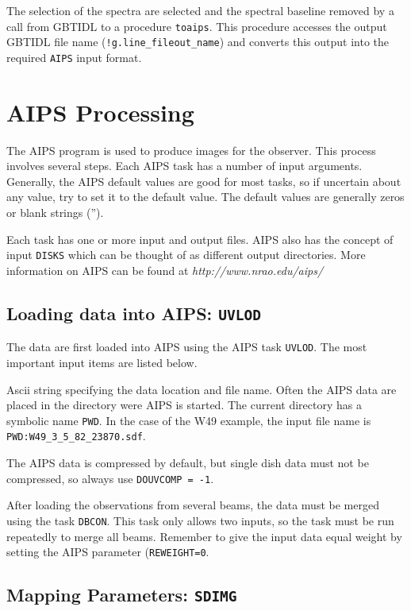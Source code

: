 \documentclass[12pt,twoside]{article}
\newcommand{\myitem}[1]{\item{\makebox[1.25in][l]{{\tt #1}}}}
\begin{document}
The selection of the spectra are selected and the spectral baseline removed by a
call from GBTIDL to a procedure {\tt toaips}.  This procedure accesses the 
output GBTIDL file name ({\tt !g.line\_fileout\_name}) and converts this
output into the required {\tt AIPS} input format.

\section{AIPS Processing}

The AIPS program is used to produce images for the observer.   This process
involves several steps.
Each AIPS task has a number of input arguments.   
Generally, the AIPS default values are good for most tasks, so if uncertain
about any value, try to set it to the default value.  The default values are
generally zeros or blank strings ('').

Each task has one or more input and output files.   AIPS also has the
concept of input {\tt DISKS} which can be thought of as different
output directories.   More information on AIPS can be found at
{\it http://www.nrao.edu/aips/}

\subsection{Loading data into AIPS: {\tt UVLOD}}
The data are first loaded into AIPS using the AIPS task {\tt UVLOD}.   
The most important input items are listed below.
\begin{description}
\myitem{ DATAIN}  Ascii string specifying the data location and file name.
Often the AIPS data are placed in the directory were AIPS is started.  
The current directory has a symbolic name {\tt PWD}.   
In the case of the W49 example, the input file name is 
{\tt PWD:W49\_3\_5\_82\_23870.sdf}.
\myitem{ DOUVCOMP}  The AIPS data is compressed by default, but
single dish data must not be compressed, so always use {\tt DOUVCOMP = -1}.
\end{description}

After loading the observations from several beams, the data must be merged
using the task {\tt DBCON}.
This task only allows two inputs, so the task must be run repeatedly to
merge all beams.   Remember to give the input data equal weight by setting
the AIPS parameter ({\tt REWEIGHT=0}.

\subsection{Mapping Parameters: {\tt SDIMG}}
\end{document}

